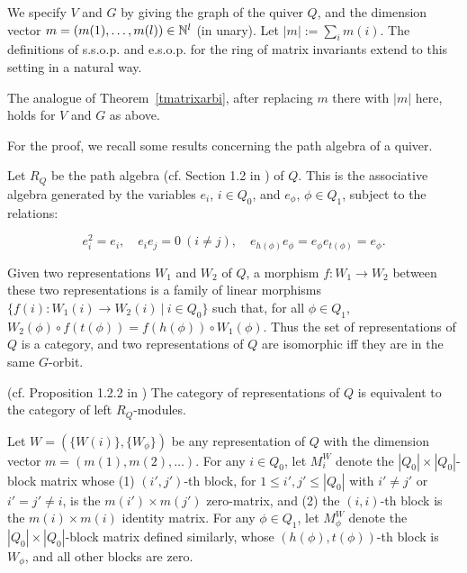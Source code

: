 \documentclass[11pt]{article}
\begin{document}
We specify $V$ and $G$ by giving  the graph of the quiver $Q$, and the
dimension vector $m=(m(1),\ldots,m(l)) \in \mathbb{N}^l$ (in unary).
Let  $|m|:=\sum_i m(i)$. The definitions of s.s.o.p. and e.s.o.p. for the ring of matrix invariants extend to this setting
in a natural way.


\begin{theorem} \label{tquiver}
The analogue of Theorem~\ref{tmatrixarbi}, after replacing $m$ there
with $|m|$ here,    holds for   $V$ and  $G$ as above.
\end{theorem}

For the proof, we recall some results concerning the path algebra of a quiver.

Let $R_Q$ be  the  path algebra (cf. Section 1.2 in \cite{brion}) of $Q$. This is the
associative algebra generated by the variables $e_i$, $i \in Q_0$,
and $e_\phi$, $\phi \in Q_1$, subject to the relations:

\begin{equation} 
e_i^2 = e_i, \quad e_i e_j = 0 \ (i\not = j), \quad 
e_{h(\phi)} e_\phi = e_\phi e_{t(\phi)} = e_\phi.
\end{equation}

Given two representations $W_1$ and $W_2$ of $Q$, a morphism $f: W_1 \rightarrow W_2$ between these 
two representations 
is  a family of linear morphisms $\{f(i): W_1(i) \rightarrow W_2(i)
\ | \ i \in Q_0\}$ such that, for all  $\phi \in Q_1$, $W_2(\phi) \circ f(t(\phi)) = f(h(\phi)) \circ W_1(\phi)$. Thus  the set of representations of $Q$ is a category, and two representations 
of $Q$  are  isomorphic iff they are in the same $G$-orbit.

\begin{prop} (cf. Proposition 1.2.2 in \cite{brion}) \label{pbrion}
The category of representations of $Q$ is equivalent to the category of 
left $R_Q$-modules.
\end{prop}

Let $W=(\{W(i)\},\{W_\phi\})$ be any representation of $Q$ with the dimension vector
$m=(m(1), m(2), \ldots)$. For any $i \in Q_0$, 
let $M^W_i$ denote 
the $|Q_0| \times |Q_0|$-block matrix  whose (1) $(i',j')$-th
block, for $1 \le i', j' \le |Q_0|$ with  $i'\not =j'$ or $i'=j'\not = i$,   is the  $m(i')\times m(j')$ zero-matrix, and 
(2) the $(i,i)$-th block is the $m(i)\times m(i)$ identity matrix.
For any $\phi \in Q_1$, let $M^W_\phi$ denote the 
$|Q_0| \times |Q_0|$-block matrix defined similarly,
whose $(h(\phi),t(\phi))$-th block
is $W_\phi$, and  all other blocks are zero. 
\end{document}
